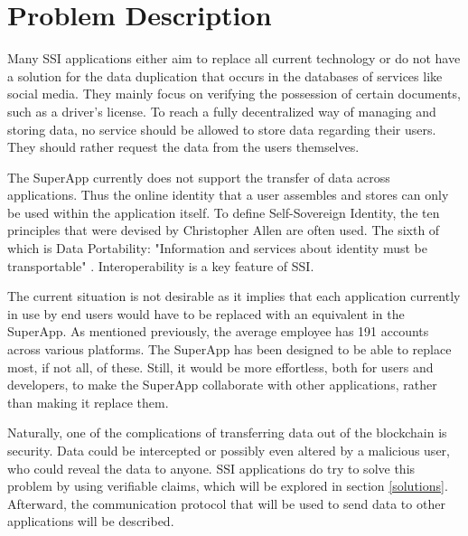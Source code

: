 \section{Problem Description}
Many SSI applications either aim to replace all current technology or do not have a solution for the data duplication that occurs in the databases of services like social media. They mainly focus on verifying the possession of certain documents, such as a driver's license. To reach a fully decentralized way of managing and storing data, no service should be allowed to store data regarding their users. They should rather request the data from the users themselves. 

The SuperApp currently does not support the transfer of data across applications. Thus the online identity that a user assembles and stores can only be used within the application itself. To define Self-Sovereign Identity, the ten principles that were devised by Christopher Allen are often used. The sixth of which is Data Portability: "Information and services about identity must be transportable" \cite[p. 14]{principles}. Interoperability is a key feature of SSI.

The current situation is not desirable as it implies that each application currently in use by end users would have to be replaced with an equivalent in the SuperApp. As mentioned previously, the average employee has 191 accounts across various platforms. The SuperApp has been designed to be able to replace most, if not all, of these. Still, it would be more effortless, both for users and developers, to make the SuperApp collaborate with other applications, rather than making it replace them. 

Naturally, one of the complications of transferring data out of the blockchain is security. Data could be intercepted or possibly even altered by a malicious user, who could reveal the data to anyone. SSI applications do try to solve this problem by using verifiable claims, which will be explored in section \ref{solutions}. Afterward, the communication protocol that will be used to send data to other applications will be described. 
